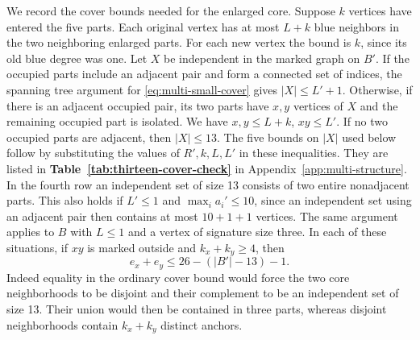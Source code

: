 We record the cover bounds needed for the enlarged core. Suppose
$k$ vertices have entered the five parts. Each original vertex has
at most $L+k$ blue neighbors in the two neighboring enlarged parts.
For each new vertex the bound is $k$, since its old blue degree was
one. Let $X$ be independent in the marked graph on $B'$. If the
occupied parts include an adjacent pair and form a connected set of
indices, the spanning tree argument for \eqref{eq:multi-small-cover}
gives $|X|\le L'+1$. Otherwise, if there is an adjacent occupied
pair, its two parts have $x,y$ vertices of $X$ and the remaining
occupied part is isolated. We have $x,y\le L+k$, $xy\le L'$.
If no two occupied parts are adjacent, then $|X|\le13$.
The five bounds on $|X|$ used below follow by substituting
the values of $R',k,L,L'$ in these inequalities. They are listed in
\textbf{Table~\ref{tab:thirteen-cover-check}} in Appendix~\ref{app:multi-structure}.
In the fourth row an independent set of size 13 consists of two entire
nonadjacent parts. This also
holds if $L'\le1$ and $\max_i a_i'\le10$, since an independent set
using an adjacent pair then contains at most $10+1+1$ vertices.
The same argument applies to $B$ with $L\le1$ and a vertex of
signature size three. In each of these situations, if $xy$ is marked
outside and $k_x+k_y\ge4$, then
\begin{equation}\label{eq:d13-improved-cover}
 e_x+e_y\le 26-(|B'|-13)-1.
\end{equation}
Indeed equality in the ordinary cover bound would force the two core
neighborhoods to be disjoint and their complement to be an independent
set of size 13. Their union would then be contained in three parts,
whereas disjoint neighborhoods contain $k_x+k_y$ distinct anchors.

